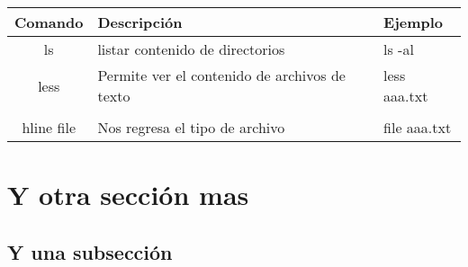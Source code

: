 \documentclass[12pt]{article}
\begin{document}
\begin{tabular}{|c|l|l|}
\hline
Comando & Descripción & Ejemplo \\
\hline
ls & listar contenido de directorios & ls -al \\ \hline
less & Permite ver el contenido de archivos de texto & less aaa.txt \\ \\hline
file & Nos regresa el tipo de archivo & file aaa.txt \\
\hline
\end{tabular} 

\section{Y otra sección mas}
\subsection{Y una subsección}


\end{document}
